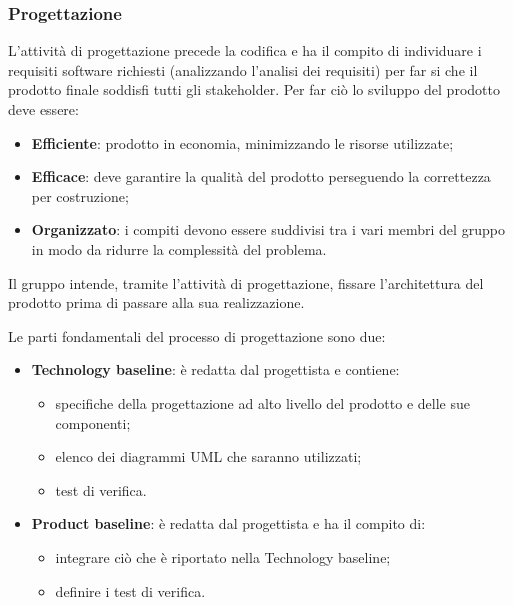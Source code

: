 \subsubsection{Progettazione}
L'attività di progettazione precede la codifica e ha il compito di individuare i requisiti software richiesti (analizzando l'analisi dei requisiti) per far si che il prodotto finale soddisfi tutti gli stakeholder. Per far ciò lo sviluppo del prodotto deve essere:
\begin{itemize}
\item \textbf{Efficiente}: prodotto in economia, minimizzando le risorse utilizzate;
\item \textbf{Efficace}: deve garantire la qualità del prodotto perseguendo la correttezza per costruzione;
\item \textbf{Organizzato}: i compiti devono essere suddivisi tra i vari membri del gruppo in modo da ridurre la complessità del problema.
\end{itemize}

Il gruppo \Omicron{} intende, tramite l'attività di progettazione, fissare l'architettura del prodotto prima di passare alla sua realizzazione. 

Le parti fondamentali del processo di progettazione sono due:
\begin{itemize}
\item \textbf{Technology baseline}: è redatta dal progettista e contiene:
\begin{itemize}
\item specifiche della progettazione ad alto livello del prodotto e delle sue componenti;
\item elenco dei diagrammi UML che saranno utilizzati;
\item test di verifica.
\end{itemize}
\item \textbf{Product baseline}: è redatta dal progettista e ha il compito di:
\begin{itemize}
\item integrare ciò che è riportato nella Technology baseline;
\item definire i test di verifica.
\end{itemize}
\end{itemize} 


